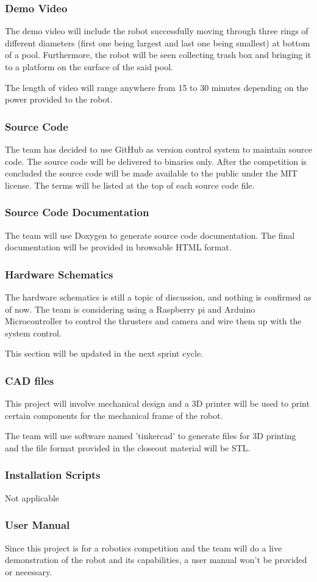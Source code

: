 \subsubsection{Demo Video}
The demo video will include the robot successfully moving through three rings of different diameters (first one being largest and last one being smallest) at bottom of a pool. Furthermore, the robot will be seen collecting trash box and bringing it to a platform on the surface of the said pool.  

The length of video will range anywhere from 15 to 30 minutes depending on the power provided to the robot.  

\subsubsection{Source Code}
The team has decided to use GitHub as version control system to maintain source code. The source code will be delivered to binaries only. After the competition is concluded the source code will be made available to the public under the MIT license. The terms will be listed at the top of each source code file.  

\subsubsection{Source Code Documentation}
The team will use Doxygen to generate source code documentation. The final documentation will be provided in browsable HTML format.  

\subsubsection{Hardware Schematics}
The hardware schematics is still a topic of discussion, and nothing is confirmed as of now. The team is considering using a Raspberry pi and Arduino Microcontroller to control the thrusters and camera and wire them up with the system control.  

This section will be updated in the next sprint cycle.  

\subsubsection{CAD files}
This project will involve mechanical design and a 3D printer will be used to print certain components for the mechanical frame of the robot.  

The team will use software named 'tinkercad' to generate files for 3D printing and the file format provided in the closeout material will be STL.  

\subsubsection{Installation Scripts}
Not applicable  

\subsubsection{User Manual}
Since this project is for a robotics competition and the team will do a live demonstration of the robot and its capabilities, a user manual won't be provided or necessary.  
